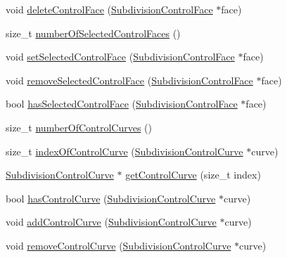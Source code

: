 \begin{DoxyCompactItemize}
\item 
void \hyperlink{classShipCAD_1_1SubdivisionSurface_a394c490440fb20c37abfc2f38d6e50fd}{delete\-Control\-Face} (\hyperlink{classShipCAD_1_1SubdivisionControlFace}{Subdivision\-Control\-Face} $\ast$face)
\item 
size\-\_\-t \hyperlink{classShipCAD_1_1SubdivisionSurface_a084a7f6b226f8d5991f7c99607d0ddb0}{number\-Of\-Selected\-Control\-Faces} ()
\item 
void \hyperlink{classShipCAD_1_1SubdivisionSurface_ab21694a435e0c0dd6139de28ae543254}{set\-Selected\-Control\-Face} (\hyperlink{classShipCAD_1_1SubdivisionControlFace}{Subdivision\-Control\-Face} $\ast$face)
\item 
void \hyperlink{classShipCAD_1_1SubdivisionSurface_aef09d950b0970bd825a984effeee6224}{remove\-Selected\-Control\-Face} (\hyperlink{classShipCAD_1_1SubdivisionControlFace}{Subdivision\-Control\-Face} $\ast$face)
\item 
bool \hyperlink{classShipCAD_1_1SubdivisionSurface_aab0e513988645c868676831ae0093a25}{has\-Selected\-Control\-Face} (\hyperlink{classShipCAD_1_1SubdivisionControlFace}{Subdivision\-Control\-Face} $\ast$face)
\item 
size\-\_\-t \hyperlink{classShipCAD_1_1SubdivisionSurface_a076772817afcb44926a3d898754261ce}{number\-Of\-Control\-Curves} ()
\item 
size\-\_\-t \hyperlink{classShipCAD_1_1SubdivisionSurface_a83c515916e068cbed7f7afd7bf11d84a}{index\-Of\-Control\-Curve} (\hyperlink{classShipCAD_1_1SubdivisionControlCurve}{Subdivision\-Control\-Curve} $\ast$curve)
\item 
\hyperlink{classShipCAD_1_1SubdivisionControlCurve}{Subdivision\-Control\-Curve} $\ast$ \hyperlink{classShipCAD_1_1SubdivisionSurface_a732c53d18277a4093ff7df12c0b08634}{get\-Control\-Curve} (size\-\_\-t index)
\item 
bool \hyperlink{classShipCAD_1_1SubdivisionSurface_acc30feeff1a889b9b291dcab3987b30a}{has\-Control\-Curve} (\hyperlink{classShipCAD_1_1SubdivisionControlCurve}{Subdivision\-Control\-Curve} $\ast$curve)
\item 
void \hyperlink{classShipCAD_1_1SubdivisionSurface_aa01ccc2ce7417960ca13075e38eb98e6}{add\-Control\-Curve} (\hyperlink{classShipCAD_1_1SubdivisionControlCurve}{Subdivision\-Control\-Curve} $\ast$curve)
\item 
void \hyperlink{classShipCAD_1_1SubdivisionSurface_abd51f7744580144550fabc086ea991b4}{remove\-Control\-Curve} (\hyperlink{classShipCAD_1_1SubdivisionControlCurve}{Subdivision\-Control\-Curve} $\ast$curve)

\end{DoxyCompactItemize}
